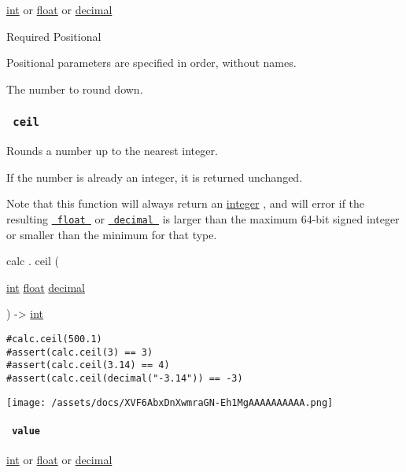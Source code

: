 \href{/docs/reference/foundations/int/}{int} {or}
\href{/docs/reference/foundations/float/}{float} {or}
\href{/docs/reference/foundations/decimal/}{decimal}

{Required} {{ Positional }}

\label{functions-floor-value-positional-tooltip}
Positional parameters are specified in order, without names.

The number to round down.

\subsubsection{\texorpdfstring{\texttt{\ ceil\ }}{ ceil }}\label{functions-ceil}

Rounds a number up to the nearest integer.

If the number is already an integer, it is returned unchanged.

Note that this function will always return an
\href{/docs/reference/foundations/int/}{integer} , and will error if the
resulting \href{/docs/reference/foundations/float/}{\texttt{\ float\ }}
or \href{/docs/reference/foundations/decimal/}{\texttt{\ decimal\ }} is
larger than the maximum 64-bit signed integer or smaller than the
minimum for that type.

calc { . } { ceil } (

{ \href{/docs/reference/foundations/int/}{int}
\href{/docs/reference/foundations/float/}{float}
\href{/docs/reference/foundations/decimal/}{decimal} }

) -\textgreater{} \href{/docs/reference/foundations/int/}{int}

\begin{verbatim}
#calc.ceil(500.1)
#assert(calc.ceil(3) == 3)
#assert(calc.ceil(3.14) == 4)
#assert(calc.ceil(decimal("-3.14")) == -3)
\end{verbatim}

\texttt{[image: /assets/docs/XVF6AbxDnXwmraGN-Eh1MgAAAAAAAAAA.png]}

\paragraph{\texorpdfstring{\texttt{\ value\ }}{ value }}\label{functions-ceil-value}

\href{/docs/reference/foundations/int/}{int} {or}
\href{/docs/reference/foundations/float/}{float} {or}
\href{/docs/reference/foundations/decimal/}{decimal}

